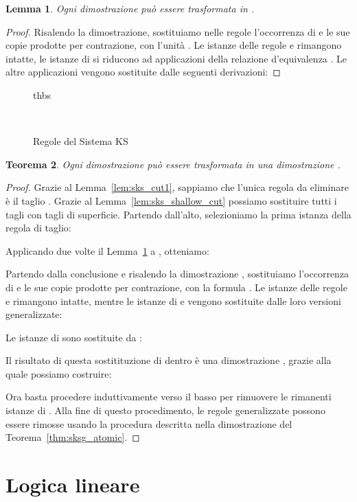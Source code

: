 \documentclass[12pt,a4paper,openright,twoside]{report}
\newtheorem{thm}{Teorema}[section]
\newtheorem{lem}[thm]{Lemma}
\begin{document}
\begin{lem}\label{lem:ks_alltrue}
Ogni dimostrazione  pu\`o essere trasformata in .
\end{lem}
\begin{proof}
Risalendo la dimostrazione, sostituiamo nelle regole l'occorrenza di  e le sue copie prodotte per contrazione, con l'unit\`a . Le istanze delle regole  e  rimangono intatte, le istanze di  si riducono ad applicazioni della relazione d'equivalenza . Le altre applicazioni vengono sostituite dalle seguenti derivazioni:

\end{proof}

\begin{figure}{thbs}

~\\

\caption{Regole del Sistema \textsf{KS}}
\label{fig:ks_cos}
\end{figure}

\begin{thm}
Ogni dimostrazione  pu\`o essere trasformata in una dimostrazione .
\end{thm}
\begin{proof}
Grazie al Lemma~\ref{lem:sks_cut1}, sappiamo che l'unica regola da eliminare \`e il taglio . Grazie al Lemma~\ref{lem:sks_shallow_cut} possiamo sostituire tutti i tagli con tagli di superficie. Partendo dall'alto, selezioniamo la prima istanza della regola di taglio:

Applicando due volte il Lemma~\ref{lem:ks_alltrue} a , otteniamo:


Partendo dalla conclusione e risalendo la dimostrazione , sostituiamo l'occorrenza di  e le sue copie prodotte per contrazione, con la formula . Le istanze delle regole  e  rimangono intatte, mentre le istanze di  e  vengono sostituite dalle loro versioni generalizzate:

Le istanze di  sono sostituite da :

Il risultato di questa sostitituzione di  dentro  \`e una dimostrazione , grazie alla quale possiamo costruire:


Ora basta procedere induttivamente verso il basso per rimuovere le rimanenti istanze di . Alla fine di questo procedimento, le regole generalizzate possono essere rimosse usando la procedura descritta nella dimostrazione del Teorema~\ref{thm:sksg_atomic}.
\end{proof}


\chapter{Logica lineare}
\end{document}
